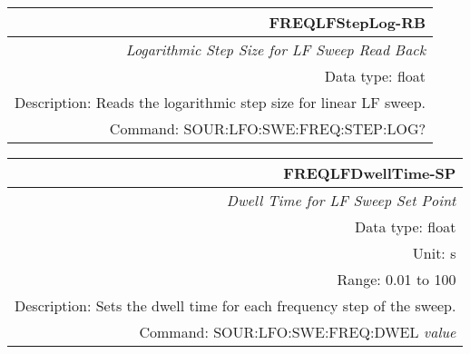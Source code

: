 \documentclass[openany]{article}
\begin{document}
		\begin{tabular}{N}
			\hline
			\bfseries FREQLFStepLog-RB \\ \hline
			\emph{Logarithmic Step Size for LF Sweep Read Back} \\
			Data type: float \\
			Description: Reads the logarithmic step size for linear LF sweep. \\
			Command: SOUR:LFO:SWE:FREQ:STEP:LOG? \\

		\end{tabular}
%
		\begin{tabular}{N}
			\hline
			\bfseries FREQLFDwellTime-SP \\ \hline
			\emph{Dwell Time for LF Sweep Set Point} \\
			Data type: float \\
			Unit: s \\
			Range: 0.01 to 100 \\
			Description: Sets the dwell time for each frequency step of the sweep.\\
			Command: SOUR:LFO:SWE:FREQ:DWEL \emph{value} \\
			
		\end{tabular}
\end{document}
